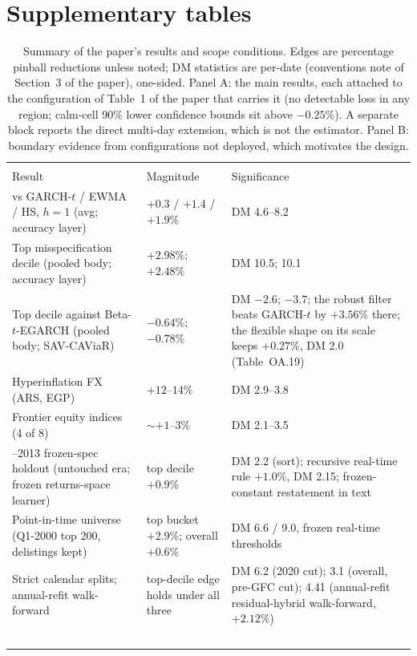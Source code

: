 \documentclass[11pt]{article}
\begin{document}
\section{Supplementary tables}
\begin{table}[htbp]
\centering\small
\begin{threeparttable}
\caption{Summary of the paper's results and scope conditions. Edges are
percentage pinball reductions unless noted; DM statistics are per-date
(conventions note of Section~3 of the paper), one-sided. Panel A: the main results, each
attached to the configuration of Table~1 of the paper that carries it (no detectable loss in any
region; calm-cell 90\% lower confidence bounds sit above $-0.25\%$). A separate block reports the
direct multi-day extension, which is not the estimator. Panel B: boundary
evidence from configurations not deployed, which motivates the design.}
\label{tab:winloss}
\footnotesize\setlength{\tabcolsep}{3.5pt}
\begin{tabular}{>{\raggedright\arraybackslash}p{}>{\raggedright\arraybackslash}p{}>{\raggedright\arraybackslash}p{}}
\toprule
\multicolumn{3}{l}{\emph{Panel A: main results (configuration in parentheses)}} \\
Result & Magnitude & Significance \\
\midrule
vs GARCH-$t$ / EWMA / HS, $h{=}1$ (avg; accuracy layer) & $+0.3$ / $+1.4$ / $+1.9\%$ & DM 4.6--8.2 \\
Top misspecification decile (pooled body; accuracy layer) & $+2.98\%$; $+2.48\%$ & DM 10.5; 10.1 \\
Top decile against Beta-$t$-EGARCH (pooled body; SAV-CAViaR) & $-0.64\%$; $-0.78\%$ & DM $-2.6$; $-3.7$; the robust filter beats GARCH-$t$ by $+3.56\%$ there; the flexible shape on its scale keeps $+0.27\%$, DM 2.0 (Table~OA.19) \\
Hyperinflation FX (ARS, EGP) & $+12$--$14\%$ & DM 2.9--3.8 \\
Frontier equity indices (4 of 8) & $\sim$$+1$--$3\%$ & DM 2.1--3.5 \\
2000--2013 frozen-spec holdout (untouched era; frozen returns-space learner) & top decile $+0.9\%$ & DM 2.2 (sort); recursive real-time rule $+1.0\%$, DM 2.15; frozen-constant restatement in text \\
Point-in-time universe (Q1-2000 top 200, delistings kept) & top bucket $+2.9\%$; overall $+0.6\%$ & DM 6.6 / 9.0, frozen real-time thresholds \\
Strict calendar splits; annual-refit walk-forward & top-decile edge holds under all three & DM 6.2 (2020 cut); 3.1 (overall, pre-GFC cut); 4.41 (annual-refit residual-hybrid walk-forward, $+2.12\%$) \\
$$
\end{tabular}
\end{threeparttable}
\end{table}
\end{document}
